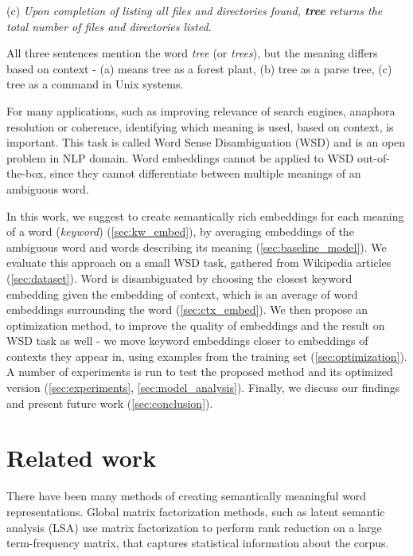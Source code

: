 \documentclass{llncs}
\begin{document}
(c) \textit{Upon completion of listing all files and directories found, \textbf{tree} returns the total number of files and directories listed.}
\medskip

All three sentences mention the word \textit{tree} (or \textit{trees}), but the meaning differs based on context - (a) means tree as a forest plant, (b) tree as a parse tree, (c) tree as a command in Unix systems.

For many applications, such as improving relevance of search engines, anaphora resolution or coherence, identifying which meaning is used, based on context, is important.
This task is called Word Sense Disambiguation (WSD) and is an open problem in NLP domain.
Word embeddings cannot be applied to WSD out-of-the-box, since they cannot differentiate between multiple meanings of an ambiguous word.

In this work, we suggest to create semantically rich embeddings for each meaning of a word (\textit{keyword}) (\ref{sec:kw_embed}), by averaging embeddings of the ambiguous word and words describing its meaning (\ref{sec:baseline_model}).
We evaluate this approach on a small WSD task, gathered from Wikipedia articles (\ref{sec:dataset}).
Word is disambiguated by choosing the closest keyword embedding given the embedding of context, which is an average of word embeddings surrounding the word (\ref{sec:ctx_embed}).
We then propose an optimization method, to improve the quality of embeddings and the result on WSD task as well -  we move keyword embeddings closer to embeddings of contexts they appear in, using examples from the training set (\ref{sec:optimization}).
A number of experiments is run to test the proposed method and its optimized version (\ref{sec:experiments}, \ref{sec:model_analysis}).
Finally, we discuss our findings and present future work (\ref{sec:conclusion}).

\section{Related work}
\label{sec:related_work}


There have been many methods of creating semantically meaningful word representations.
Global matrix factorization methods, such as latent semantic analysis (LSA)\cite{LSA} use matrix factorization to perform rank reduction on a large term-frequency matrix, that captures statistical information about the corpus.
\end{document}
